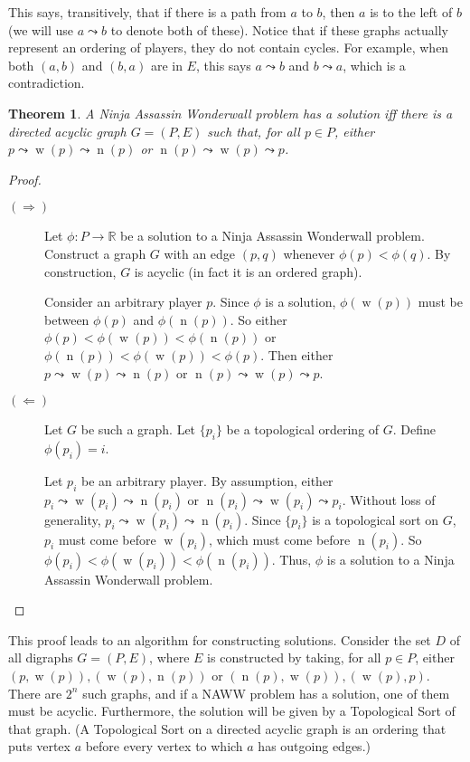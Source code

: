\documentclass[12pt]{article}
\newtheorem*{thm}{Theorem}
\DeclareMathOperator{\w}{w}
\DeclareMathOperator{\n}{n}
\begin{document}
    This says, transitively, that if there is a path from $a$ to $b$, then $a$ is to the left of $b$ (we will use $a \leadsto b$ to denote both of these). Notice that if these graphs actually represent an ordering of players, they do not contain cycles. For example, when both $(a,b)$ and $(b,a)$ are in $E$, this says $a \leadsto b$ and $b \leadsto a$, which is a contradiction. 

    \begin{thm}
    A Ninja Assassin Wonderwall problem has a solution iff there is a directed acyclic graph $G=(P,E)$ such that, for all $p\in P$, either  $p \leadsto \w(p) \leadsto \n(p)$ or $\n(p) \leadsto \w(p) \leadsto p$.
    \end{thm}
    \begin{proof} \mbox{}

    \begin{description}
    \item[$(\Rightarrow)$] Let $\phi: P \to \mathbb{R}$ be a solution to a Ninja Assassin Wonderwall problem. Construct a graph $G$ with an edge $(p,q)$ whenever $\phi(p)<\phi(q)$. By construction, $G$ is acyclic (in fact it is an ordered graph).

    Consider an arbitrary player $p$. Since $\phi$ is a solution, $\phi(\w(p))$ must be between $\phi(p)$ and $\phi(\n(p))$. So either $\phi(p) < \phi(\w(p)) < \phi(\n(p))$ or $\phi(\n(p)) < \phi(\w(p)) < \phi(p)$. Then either $p \leadsto \w(p) \leadsto \n(p)$ or $\n(p) \leadsto \w(p) \leadsto p$.

    \item[$(\Leftarrow)$] Let $G$ be such a graph. Let $\{p_i\}$ be a topological ordering of $G$. Define $\phi(p_i) = i$. 

    Let $p_i$ be an arbitrary player. By assumption, either $p_i \leadsto \w(p_i) \leadsto \n(p_i)$ or $\n(p_i) \leadsto \w(p_i) \leadsto p_i$. Without loss of generality, $p_i \leadsto \w(p_i) \leadsto \n(p_i)$. Since $\{p_i\}$ is a topological sort on $G$, $p_i$ must come before $\w(p_i)$, which must come before $\n(p_i)$. So $\phi(p_i) < \phi(\w(p_i)) < \phi(\n(p_i))$. Thus, $\phi$ is a solution to a Ninja Assassin Wonderwall problem.
    \end{description}
    \end{proof}

    This proof leads to an algorithm for constructing solutions. Consider the set $D$ of all digraphs $G=(P,E)$, where $E$ is constructed by taking, for all $p \in P$, either  $(p,\w(p)), (\w(p),\n(p))$ or $(\n(p),\w(p)),(\w(p),p)$. There are $2^n$ such graphs, and if a NAWW problem has a solution, one of them must be acyclic. Furthermore, the solution will be given by a Topological Sort of that graph. (A Topological Sort on a directed acyclic graph is an ordering that puts vertex $a$ before every vertex to which $a$ has outgoing edges.)
\end{document}
